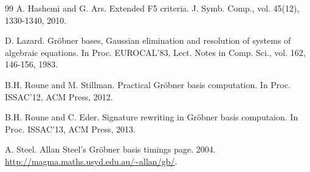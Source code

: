 \documentclass[final, number, 3p,12pt]{elsarticle}
\begin{document}
\begin{thebibliography}{99}
A. Hashemi and G. Ars. Extended F5 criteria. J. Symb. Comp., vol. 45(12), 1330-1340, 2010.


D. Lazard. Gr\"obner bases, Gaussian elimination and resolution of systems of algebraic equations. In Proc. EUROCAL'83, Lect. Notes in Comp. Sci., vol. 162, 146-156, 1983.






B.H. Roune and M. Stillman. Practical Gr\"obner basis computation. In Proc. ISSAC'12, ACM Press, 2012.

B.H. Roune and C. Eder. Signature rewriting in Gr\"obner basis computaion. In Proc. ISSAC'13, ACM Press, 2013.



A. Steel. Allan Steel's Gr\"obner basis timings page. 2004.  {\url {http://magma.maths.usyd.edu.au/~allan/gb/}}. 



\end{thebibliography}
\end{document}
